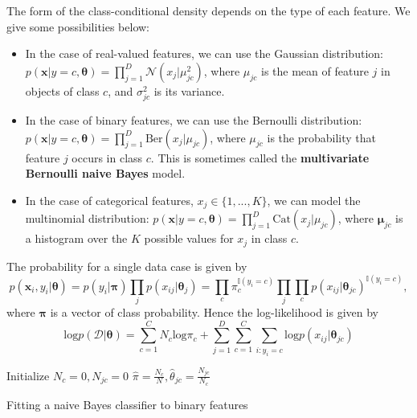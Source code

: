   The form of the class-conditional density depends on the type of each feature. We give some possibilities below:
  \begin{itemize}
    \item In the case of real-valued features, we can use the Gaussian distribution: $p(\mathbf{x}|y=c, \boldsymbol{\theta}) = \prod_{j=1}^{D}\mathcal{N}(x_j|\mu_{jc}^2)$, where $\mu_{jc}$ is the mean of feature $j$ in objects of class $c$, and $\sigma_{jc}^2$ is its variance.
    \item In the case of binary features, we can use the Bernoulli distribution: $p(\mathbf{x}|y=c, \boldsymbol{\theta}) = \prod_{j=1}^{D}\textrm{Ber}(x_j|\mu_{jc})$, where $\mu_{jc}$ is the probability that feature $j$ occurs in class $c$. This is sometimes called the \textbf{multivariate Bernoulli naive Bayes} model.
    \item In the case of categorical features, $x_j\in \{1,...,K\}$, we can model the multinomial distribution: $p(\mathbf{x}|y=c, \boldsymbol{\theta}) = \prod_{j=1}^{D}\textrm{Cat}(x_j|\mu_{jc})$, where $\boldsymbol{\mu}_{jc}$ is a histogram over the $K$ possible values for $x_j$ in class $c$.
  \end{itemize}

The probability for a single data case is given by
$$p(\mathbf{x}_i,y_i|\boldsymbol{\theta}) = p(y_i|\boldsymbol{\pi})\prod_{j}p(x_{ij}|\boldsymbol{\theta}_j)=\prod_{c}\pi_{c}^{\mathds{I}(y_i=c)}\prod_{j}\prod_{c}p(x_{ij}|\boldsymbol{\theta}_{jc})^{\mathds{I}(y_i=c)},$$
where $\boldsymbol{\pi}$ is a vector of class probability. Hence the log-likelihood is given by
	$$\textrm{log}p(\mathcal{D}|\boldsymbol{\theta}) = \sum_{c=1}^{C}N_c\textrm{log}\pi_c+\sum_{j=1}^{D}\sum_{c=1}^{C}\sum_{i:y_i=c}\textrm{log}p(x_{ij}|\boldsymbol{\theta}_{jc})$$

	\begin{algorithm}[H]
		\SetAlgoLined
		Initialize $N_c=0,N_{jc}=0$ \;
  $\hat{\pi}=\frac{N_c}{N},\hat{\theta}_{jc}=\frac{N_{jc}}{N_c}$
	\caption{Fitting a naive Bayes classifier to binary features}
\end{algorithm}
